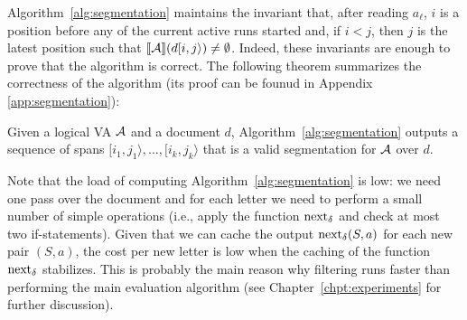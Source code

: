 Algorithm~\ref{alg:segmentation} maintains the invariant that, after reading
$a_\ell$, $i$ is a position before any of the current active runs started and,
if $i < j$,  then $j$ is the latest position such that $\llbracket\mathcal{A}\rrbracket(d[i, j\rangle)
\neq \emptyset$. Indeed, these invariants are enough to prove that the algorithm
is correct. The following theorem summarizes the correctness of the algorithm
(its proof can be founud in Appendix \ref*{app:segmentation}):

\begin{theorem}\label{theo:segmentation} Given a logical VA $\mathcal{A}$ and a document
	$d$, Algorithm~\ref{alg:segmentation} outputs a sequence of spans $[i_1,
	j_1\rangle, \ldots, [i_k, j_k\rangle$ that is a valid segmentation for $\mathcal{A}$
	over $d$.
\end{theorem}

Note that the load of computing Algorithm~\ref{alg:segmentation} is low: we need
one pass over the document and for each letter we need to perform a small number
of simple operations (i.e., apply the function $\operatorname{next}_{\delta}$ and check at most two
if-statements). Given that we can cache the output $\operatorname{next}_{\delta}(S, a)$ for each new
pair $(S, a)$, the cost per new letter is low when the caching of the function
$\operatorname{next}_{\delta}$ stabilizes. This is probably the main reason why filtering runs faster
than performing the main evaluation algorithm (see
Chapter~\ref{chpt:experiments} for further discussion).


